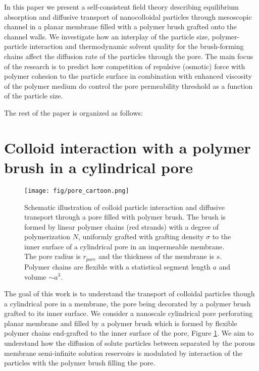 \documentclass[12pt, a4paper]{article}
\begin{document}
In this paper we present a self-consistent field theory describing equilibrium absorption and diffusive transport of nanocolloidal particles
through mesoscopic channel in a planar membrane filled with a polymer brush grafted onto the channel walls. We investigate how an interplay of the particle size,
polymer-particle interaction and thermodynamic solvent quality for the brush-forming chains affect the diffusion rate of the particles through the pore. 
The main focus of the research is to predict how competition of repulsive (osmotic) force with polymer cohesion to the particle surface in combination with
enhanced viscosity of the polymer medium do control the  pore permeability threshold as a function of the particle size.


The rest of the paper is organized as follows: 



\section{Colloid interaction with a polymer brush in a cylindrical pore}


\begin{figure}
    \centering
    \texttt{[image: fig/pore\_cartoon.png]}
    \caption{
        Schematic illustration of colloid particle interaction and diffusive transport through a pore filled with polymer brush. 
        The brush is formed by linear polymer chains (red strands) with a degree of polymerization $N$, uniformly grafted with grafting density $\sigma$  
        to the inner surface of a cylindrical pore in an impermeable membrane. The pore radius is $r_{pore}$ and the thickness of the membrane is $s$.
        Polymer chains are flexible with a statistical segment length $a$ and volume $\sim a^3$.
}
    \label{fig:colloid_transport}
\end{figure}

The goal of this work is to understand the transport of colloidal particles though a cylindrical pore in a membrane, the pore being decorated by a polymer brush grafted to its inner surface. 
We consider a nanoscale cylindrical pore perforating planar membrane and filled by a polymer brush which is formed  
by flexible polymer chains end-grafted to the inner surface of the pore, Figure \ref{fig:colloid_transport}. 
We aim to understand how the diffusion of solute particles between separated by the porous
membrane semi-infinite solution reservoirs is modulated by interaction of the particles with the 
polymer brush filling the pore.
\end{document}

